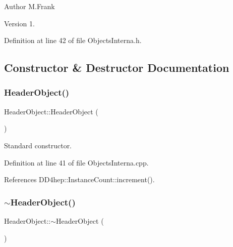 \begin{DoxyAuthor}{Author}
M.\+Frank 
\end{DoxyAuthor}
\begin{DoxyVersion}{Version}
1. 
\end{DoxyVersion}


Definition at line 42 of file Objects\+Interna.\+h.



\subsection{Constructor \& Destructor Documentation}
\hypertarget{class_d_d4hep_1_1_geometry_1_1_header_object_a5eed0824bd2e8fc9bdc3a83741bea1d0}{}\label{class_d_d4hep_1_1_geometry_1_1_header_object_a5eed0824bd2e8fc9bdc3a83741bea1d0} 
\subsubsection{\texorpdfstring{Header\+Object()}{HeaderObject()}\hspace{0.1cm}{\footnotesize\ttfamily [1/2]}}
{\footnotesize\ttfamily Header\+Object\+::\+Header\+Object (\begin{DoxyParamCaption}{ }\end{DoxyParamCaption})}



Standard constructor. 



Definition at line 41 of file Objects\+Interna.\+cpp.



References D\+D4hep\+::\+Instance\+Count\+::increment().

\hypertarget{class_d_d4hep_1_1_geometry_1_1_header_object_a85f2f362b11a0ebb206e118489a3810f}{}\label{class_d_d4hep_1_1_geometry_1_1_header_object_a85f2f362b11a0ebb206e118489a3810f} 
\subsubsection{\texorpdfstring{$\sim$\+Header\+Object()}{~HeaderObject()}}
{\footnotesize\ttfamily Header\+Object\+::$\sim$\+Header\+Object (\begin{DoxyParamCaption}{ }\end{DoxyParamCaption})\hspace{0.3cm}{\ttfamily [virtual]}}



